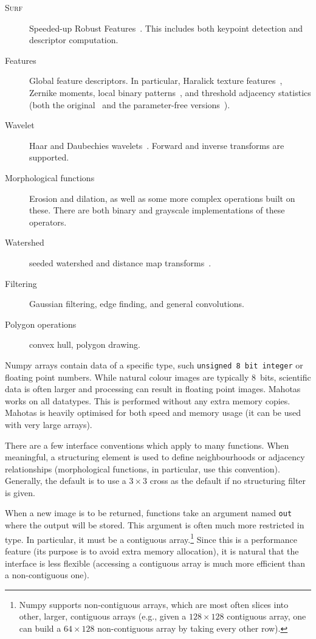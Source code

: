 \documentclass{scrartcl}
\let\code\texttt
\begin{document}
\begin{description}
\item[\textsc{Surf}] Speeded-up Robust Features~\citep{eth_biwi_00517}. This
includes both keypoint detection and descriptor computation.
\item[Features] Global feature descriptors. In particular, Haralick texture
features~\citep{Haralick1973}, Zernike moments, local binary
patterns~\citep{Ojala2002}, and threshold adjacency statistics (both the
original~\citep{Hamilton2007} and the parameter-free
versions~\citep{Coelho2010}).
\item[Wavelet] Haar and Daubechies wavelets~\citep{Daubechies90}. Forward and
inverse transforms are supported.
\item[Morphological functions] Erosion and dilation, as well as some more
complex operations built on these. There are both binary and grayscale
implementations of these operators.
\item[Watershed] seeded watershed and distance map
transforms~\citep{felzenszwalb}.
\item[Filtering] Gaussian filtering, edge finding, and general convolutions.
\item[Polygon operations] convex hull, polygon drawing.
\end{description}

Numpy arrays contain data of a specific type, such \code{unsigned 8 bit
integer} or floating point numbers. While natural colour images are typically
8~bits, scientific data is often larger and processing can result in floating
point images. Mahotas works on all datatypes. This is performed without any
extra memory copies. Mahotas is heavily optimised for both speed and memory
usage (it can be used with very large arrays).

There are a few interface conventions which apply to many functions. When
meaningful, a structuring element is used to define neighbourhoods or adjacency
relationships (morphological functions, in particular, use this convention).
Generally, the default is to use a $3 \times 3$ cross as the default if no
structuring filter is given.

When a new image is to be returned, functions take an argument named \code{out}
where the output will be stored. This argument is often much more restricted in
type. In particular, it must be a contiguous array.\footnote{Numpy supports
non-contiguous arrays, which are most often slices into other, larger,
contiguous arrays (e.g., given a $128 \times 128$ contiguous array, one can
build a $64 \times 128$ non-contiguous array by taking every other row).} Since
this is a performance feature (its purpose is to avoid extra memory
allocation), it is natural that the interface is less flexible (accessing a
contiguous array is much more efficient than a non-contiguous one).
\end{document}
